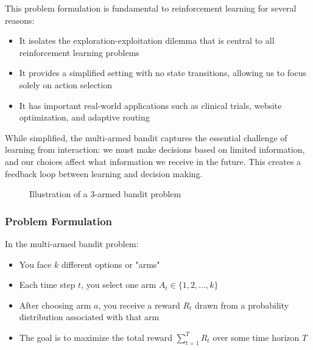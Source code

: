 \documentclass{article}
\begin{document}
This problem formulation is fundamental to reinforcement learning for several reasons:
\begin{itemize}
    \item It isolates the exploration-exploitation dilemma that is central to all reinforcement learning problems
    \item It provides a simplified setting with no state transitions, allowing us to focus solely on action selection
    \item It has important real-world applications such as clinical trials, website optimization, and adaptive routing
\end{itemize}

While simplified, the multi-armed bandit captures the essential challenge of learning from interaction: we must make decisions based on limited information, and our choices affect what information we receive in the future. This creates a feedback loop between learning and decision making.

\begin{figure}[h]
\centering
{}
\caption{Illustration of a 3-armed bandit problem}
\end{figure}

\subsubsection{Problem Formulation}
In the multi-armed bandit problem:
\begin{itemize}
    \item You face $k$ different options or "arms"
    \item Each time step $t$, you select one arm $A_t \in \{1, 2, ..., k\}$
    \item After choosing arm $a$, you receive a reward $R_t$ drawn from a probability distribution associated with that arm
    \item The goal is to maximize the total reward $\sum_{t=1}^{T} R_t$ over some time horizon $T$
\end{itemize}
\end{document}
